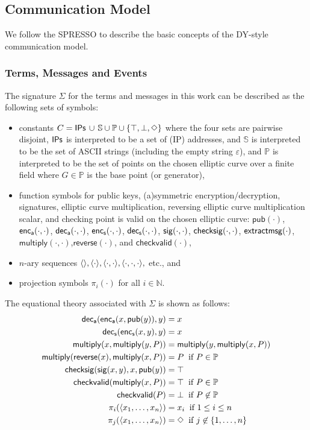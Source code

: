 \subsection{Communication Model}
We follow the SPRESSO to describe the basic concepts of the DY-style communication model.

\subsubsection{Terms, Messages and Events}

The signature $\Sigma$ for the terms and
messages in this work can be described as the following sets of symbols:
\begin{itemize}
\item constants $C = \mathsf{IPs}\,\cup\, \mathbb{S}\cup\mathbb{P}\cup  \{\top,\bot,\Diamond\}$ where the four sets are pairwise disjoint,
$\mathsf{IPs}$ is interpreted to be a set of (IP) addresses,
and $\mathbb{S}$ is interpreted to be the set of ASCII strings
  (including the empty string $\varepsilon$),
and $\mathbb{P}$ is interpreted to be the set of points on the chosen elliptic curve over a finite field where $G \in \mathbb{P}$ is the base point (or generator),
\item function symbols for public keys, (a)symmetric
  en\-cryp\-tion/de\-cryp\-tion, signatures, elliptic curve multiplication, reversing elliptic curve multiplication scalar, and checking point is valid on the chosen elliptic curve: $\mathsf{pub}(\cdot)$,
  $\mathsf{enc}_\mathsf{a}(\cdot,\cdot)$, $\mathsf{dec}_\mathsf{a}(\cdot,\cdot)$, $\mathsf{enc}_\mathsf{s}(\cdot,\cdot)$,
  $\mathsf{dec}_\mathsf{s}(\cdot,\cdot)$, $\mathsf{sig}({\cdot},{\cdot})$,
  $\mathsf{checksig}(\cdot,\cdot)$,  $\mathsf{extractmsg}(\cdot)$,
  $\mathsf{multiply}(\cdot, \cdot)$,$\mathsf{reverse}(\cdot)$,
  and $\mathsf{checkvalid}(\cdot)$,
\item $n$-ary sequences $\langle\rangle, \langle\cdot\rangle, \langle\cdot,\cdot\rangle,
  \langle\cdot,\cdot,\cdot\rangle,$ etc., and
\item projection symbols $\pi_i(\cdot)$ for all $i \in \mathbb{N}$.
\end{itemize}

The equational theory associated with $\Sigma$ is shown as follows:
\begin{align*}
\dec{\enc x{\pub(y)}}{y} &= x\\
\decs{\encs x{y}}{y} &= x\\
\mathsf{multiply}(x, \mathsf{multiply}(y, P)) &= \mathsf{multiply}(y, \mathsf{multiply}(x, P))\\
\mathsf{multiply}(\mathsf{reverse}(x), \mathsf{multiply}(x, P)) &= P \text{\;\;if\ } P \in \mathbb{P}\\
\checksigThree{\sig{x}{y}}{x}{\pub(y)} &= \True\\
\mathsf{checkvalid}(\mathsf{multiply}(x, P)) &= \True  \text{\;\;if\ } P \in \mathbb{P}\\
\mathsf{checkvalid}(P) &= \bot  \text{\;\;if\ } P \not\in \mathbb{P}\\
\pi_i(\an{x_1,\dots,x_n}) &= x_i \text{\;\;if\ } 1 \leq i \leq n \\
\proj{j}{\an{x_1,\dots,x_n}} &= \notdef \text{\;\;if\ } j
\not\in \{1,\dots,n\}
\end{align*}

